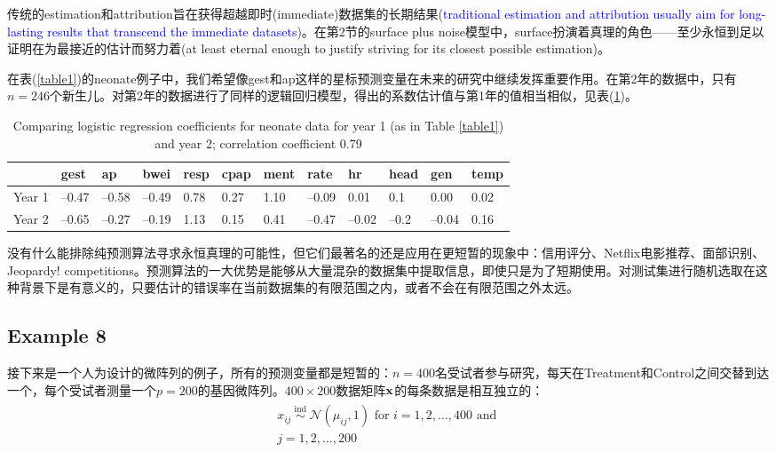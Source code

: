 \documentclass[lang=cn,11pt,a4paper,cite=authoryear]{elegantpaper}
\begin{document}
传统的estimation和attribution旨在获得超越即时(immediate)数据集的长期结果(\textcolor{blue}{traditional estimation and attribution usually aim for long-lasting results that transcend the immediate datasets})。在第2节的surface plus noise模型中，surface扮演着真理的角色——至少永恒到足以证明在为最接近的估计而努力着(at least eternal enough to justify striving for its closest possible estimation)。

在表(\ref{table1})的neonate例子中，我们希望像gest和ap这样的星标预测变量在未来的研究中继续发挥重要作用。在第2年的数据中，只有$n=246$个新生儿。对第2年的数据进行了同样的逻辑回归模型，得出的系数估计值与第1年的值相当相似，见表(\ref{table4})。

\begin{table}[H]
    \centering
    \caption{Comparing logistic regression coefficients for neonate data for year 1 (as in Table \ref{table1}) and year 2; correlation coefficient 0.79}
    \label{table4}
    \begin{tabular}{llllllllllll}
    \toprule
    & gest & ap & bwei & resp & cpap & ment & rate & hr & head & gen & temp \\
    \midrule 
    Year 1 & –0.47 & –0.58 & –0.49 & 0.78 & 0.27 & 1.10 & –0.09 & 0.01 & 0.1 & 0.00 & 0.02 \\ 
    Year 2 & –0.65 & –0.27 & –0.19 & 1.13 & 0.15 & 0.41 & –0.47 & –0.02 & –0.2 & –0.04 & 0.16 \\ 
    \bottomrule
    \end{tabular}
\end{table}

没有什么能排除纯预测算法寻求永恒真理的可能性，但它们最著名的还是应用在更短暂的现象中：信用评分、Netflix电影推荐、面部识别、Jeopardy! competitions。预测算法的一大优势是能够从大量混杂的数据集中提取信息，即使只是为了短期使用。对测试集进行随机选取在这种背景下是有意义的，只要估计的错误率在当前数据集的有限范围之内，或者不会在有限范围之外太远。

\subsection{Example 8}

接下来是一个人为设计的微阵列的例子，所有的预测变量都是短暂的：$n=400$名受试者参与研究，每天在Treatment和Control之间交替到达一个，每个受试者测量一个$p=200$的基因微阵列。$400 \times 200$数据矩阵$\bold{x}$的每条数据是相互独立的：
\begin{align}
\begin{array}{c}
x_{i j} \stackrel{\text { ind }}{\sim} \mathcal{N}\left(\mu_{i j}, 1\right) \text { for } i=1,2, \ldots, 400 \text { and } \\
j=1,2, \ldots, 200
\end{array}
\end{align}
\end{document}
